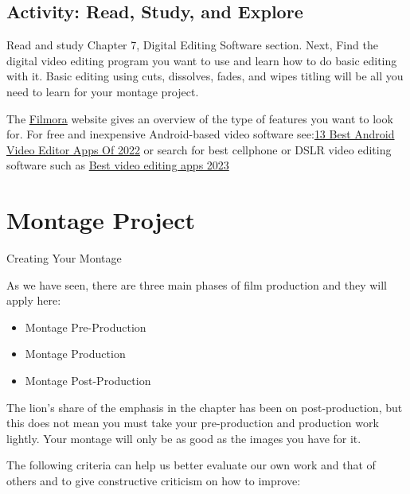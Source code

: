 \documentclass[
]{book}
\providecommand{\tightlist}{%
  \setlength{\itemsep}{0pt}\setlength{\parskip}{0pt}}
\begin{document}
\hypertarget{activity-read-study-and-explore}{%
\subsection*{Activity: Read, Study, and Explore}\label{activity-read-study-and-explore}}

\begin{reflect}
Read and study Chapter 7, Digital Editing Software section. Next, Find the digital video editing program you want to use and learn how to do basic editing with it. Basic editing using cuts, dissolves, fades, and wipes titling will be all you need to learn for your montage project.

The \href{https://filmora.wondershare.net/filmora-video-editor.html?}{Filmora} website gives an overview of the type of features you want to look for. For free and inexpensive Android-based video software see:\href{https://fossbytes.com/best-android-video-editor-apps/}{13 Best Android Video Editor Apps Of 2022} or search for best cellphone or DSLR video editing software such as \href{https://www.tomsguide.com/best-picks/best-video-editing-apps}{Best video editing apps 2023}
\end{reflect}

\hypertarget{montage-project}{%
\section{Montage Project}\label{montage-project}}

{Creating Your Montage}

As we have seen, there are three main phases of film production and they will apply here:

\begin{itemize}
\tightlist
\item
  Montage Pre-Production
\item
  Montage Production
\item
  Montage Post-Production
\end{itemize}

The lion's share of the emphasis in the chapter has been on post-production, but this does not mean you must take your pre-production and production work lightly. Your montage will only be as good as the images you have for it.

The following criteria can help us better evaluate our own work and that of others and to give constructive criticism on how to improve:
\end{document}
